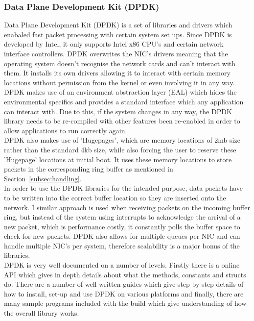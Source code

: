 \documentclass[interim_report.tex]{subfiles}
\begin{document}
\subsubsection{Data Plane Development Kit (DPDK)}
\label{subsec:dpdk}
Data Plane Development Kit (DPDK) \cite{dpdk} is a set of libraries and drivers which enabaled fast packet processing with certain system set ups. Since DPDK is developed by Intel, it only supports Intel x86 CPU's and certain network interface controllers. DPDK overwrites the NIC's drivers meaning that the operating system doesn't recognise the network cards and can't interact with them. It installs its own drivers allowing it to interact with certain memory locations without permission from the kernel or even involving it in any way. \\
\newline
DPDK makes use of an environment abstraction layer (EAL) which hides the environmental specifics and provides a standard interface which any application can interact with. Due to this, if the system changes in any way, the DPDK library needs to be re-compiled with other features been re-enabled in order to allow applications to run correctly again. \\
\newline
DPDK also makes use of 'Hugepages', which are memory locations of 2mb size rather than the standard 4kb size, while also forcing the user to reserve these 'Hugepage' locations at initial boot. It uses these memory locations to store packets in the corresponding ring buffer as mentioned in Section~\ref{subsec:handling}. \\
\newline
In order to use the DPDK libraries for the intended purpose, data packets have to be written into the correct buffer location so they are inserted onto the network. I similar approach is used when receiving packets on the incoming buffer ring, but instead of the system using interrupts to acknowledge the arrival of a new packet, which is performance costly, it constantly polls the buffer space to check for new packets. DPDK also allows for multiple queues per NIC and can handle multiple NIC's per system, therefore scalability is a major bonus of the libraries. \\
\newline
DPDK is very well documented on a number of levels. Firstly there is a online API which gives in depth details about what the methods, constants and structs do. There are a number of well written guides which give step-by-step details of how to install, set-up and use DPDK on various platforms and finally, there are many sample programs included with the build which give understanding of how the overall library works.
\end{document}
